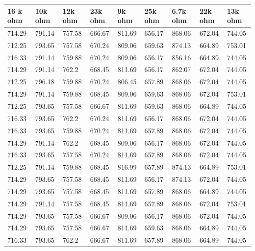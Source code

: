 \begin{longtable}{|l|l|l|l|l|l|l|l|l|}
		\hline
		16 k ohm & 10k ohm & 12k ohm & 23k ohm & 9k ohm & 25k ohm & 6.7k ohm & 22k ohm & 13k ohm \\ \hline
		714.29   & 791.14  & 757.58  & 666.67  & 811.69 & 656.17  & 868.06   & 672.04  & 744.05  \\ \hline
		712.25   & 793.65  & 757.58  & 670.24  & 809.06 & 659.63  & 874.13   & 664.89  & 753.01  \\ \hline
		716.33   & 791.14  & 759.88  & 670.24  & 809.06 & 656.17  & 856.16   & 664.89  & 744.05  \\ \hline
		714.29   & 791.14  & 762.2   & 668.45  & 811.69 & 656.17  & 862.07   & 672.04  & 744.05  \\ \hline
		712.25   & 796.18  & 759.88  & 670.24  & 806.45 & 657.89  & 868.06   & 672.04  & 744.05  \\ \hline
		714.29   & 791.14  & 759.88  & 668.45  & 809.06 & 659.63  & 868.06   & 672.04  & 753.01  \\ \hline
		712.25   & 793.65  & 757.58  & 666.67  & 811.69 & 659.63  & 868.06   & 664.89  & 744.05  \\ \hline
		716.33   & 793.65  & 762.2   & 670.24  & 811.69 & 656.17  & 868.06   & 672.04  & 744.05  \\ \hline
		716.33   & 793.65  & 759.88  & 670.24  & 811.69 & 657.89  & 868.06   & 672.04  & 744.05  \\ \hline
		714.29   & 791.14  & 762.2   & 668.45  & 809.06 & 656.17  & 868.06   & 672.04  & 744.05  \\ \hline
		716.33   & 793.65  & 757.58  & 670.24  & 811.69 & 657.89  & 868.06   & 672.04  & 744.05  \\ \hline
		712.25   & 791.14  & 759.88  & 668.45  & 816.99 & 657.89  & 874.13   & 664.89  & 753.01  \\ \hline
		714.29   & 793.65  & 757.58  & 668.45  & 811.69 & 656.17  & 874.13   & 672.04  & 744.05  \\ \hline
		714.29   & 793.65  & 757.58  & 668.45  & 811.69 & 657.89  & 868.06   & 664.89  & 744.05  \\ \hline
		714.29   & 791.14  & 757.58  & 668.45  & 811.69 & 657.89  & 868.06   & 672.04  & 753.01  \\ \hline
		714.29   & 793.65  & 757.58  & 666.67  & 809.06 & 656.17  & 868.06   & 672.04  & 744.05  \\ \hline
		714.29   & 793.65  & 757.58  & 666.67  & 811.69 & 659.63  & 868.06   & 664.89  & 744.05  \\ \hline
		716.33   & 793.65  & 762.2   & 666.67  & 811.69 & 657.89  & 868.06   & 664.89  & 744.05  \\ \hline

\end{longtable}
